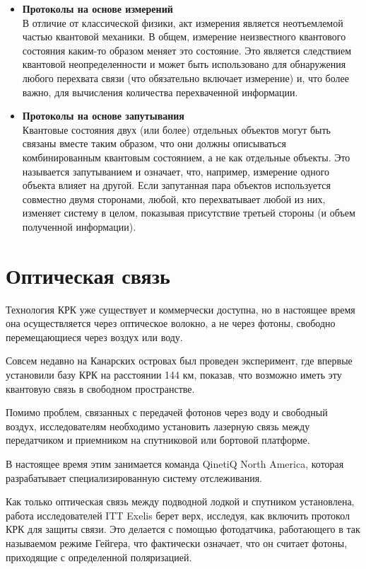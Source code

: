 \documentclass[a4paper,12pt]{article} %
\begin{document}
\begin{itemize}
\item \textbf{ Протоколы на основе измерений \\} 
В отличие от классической физики, акт измерения является неотъемлемой частью квантовой механики. В общем, измерение неизвестного квантового состояния каким-то образом меняет это состояние. Это является следствием квантовой неопределенности и может быть использовано для обнаружения любого перехвата связи (что обязательно включает измерение) и, что более важно, для вычисления количества перехваченной информации.
\item \textbf{ Протоколы на основе запутывания \\ }
Квантовые состояния двух (или более) отдельных объектов могут быть связаны вместе таким образом, что они должны описываться комбинированным квантовым состоянием, а не как отдельные объекты. Это называется запутыванием и означает, что, например, измерение одного объекта влияет на другой. Если запутанная пара объектов используется совместно двумя сторонами, любой, кто перехватывает любой из них, изменяет систему в целом, показывая присутствие третьей стороны (и объем полученной информации).

\end{itemize}

\section*{Оптическая связь}

\hspace{13pt} Технология КРК уже существует и коммерчески доступна, но в настоящее время она осуществляется через оптическое волокно, а не через фотоны, свободно перемещающиеся через воздух или воду.

Совсем недавно на Канарских островах был проведен эксперимент, где впервые установили базу КРК на расстоянии 144 км, показав, что возможно иметь эту квантовую связь в свободном пространстве.

Помимо проблем, связанных с передачей фотонов через воду и свободный воздух, исследователям необходимо установить лазерную связь между передатчиком и приемником на спутниковой или бортовой платформе.

В настоящее время этим занимается команда QinetiQ North America, которая разрабатывает специализированную систему отслеживания.

Как только оптическая связь между подводной лодкой и спутником установлена, работа исследователей ITT Exelis берет верх, исследуя, как включить протокол КРК для защиты связи. Это делается с помощью фотодатчика, работающего в так называемом режиме Гейгера, что фактически означает, что он считает фотоны, приходящие с определенной поляризацией.
\end{document}
